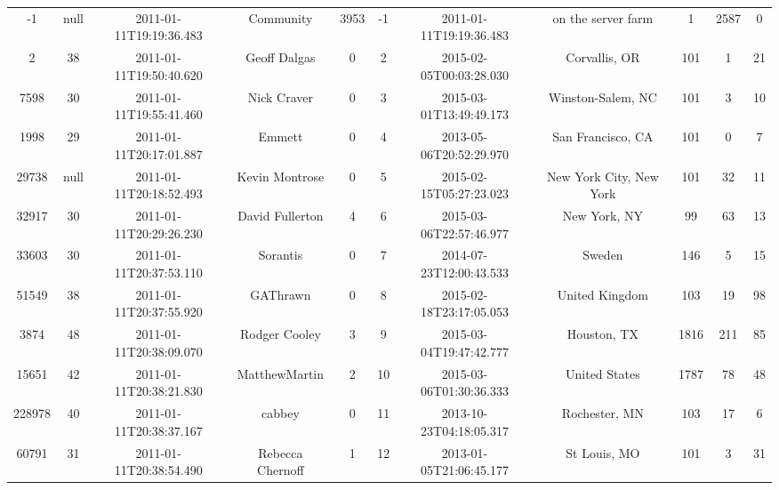 \documentclass[12pt,a4paper,twoside,openright,titlepage,final]{article}
\begin{document}
\begin{landscape}
\begin{center}
\begin{longtable}{@{\extracolsep{\fill}}*{11}{c}}
-1        & null & 2011-01-11T19:19:36.483 & Community             & 3953      & -1    & 2011-01-11T19:19:36.483 & on the server farm               & 1          & 2587    & 0     \\
			2         & 38   & 2011-01-11T19:50:40.620 & Geoff Dalgas          & 0         & 2     & 2015-02-05T00:03:28.030 & Corvallis, OR                    & 101        & 1       & 21    \\
			7598      & 30   & 2011-01-11T19:55:41.460 & Nick Craver           & 0         & 3     & 2015-03-01T13:49:49.173 & Winston-Salem, NC                & 101        & 3       & 10    \\
			1998      & 29   & 2011-01-11T20:17:01.887 & Emmett                & 0         & 4     & 2013-05-06T20:52:29.970 & San Francisco, CA                & 101        & 0       & 7     \\
			29738     & null & 2011-01-11T20:18:52.493 & Kevin Montrose        & 0         & 5     & 2015-02-15T05:27:23.023 & New York City, New York          & 101        & 32      & 11    \\
			32917     & 30   & 2011-01-11T20:29:26.230 & David Fullerton       & 4         & 6     & 2015-03-06T22:57:46.977 & New York, NY                     & 99         & 63      & 13    \\
			33603     & 30   & 2011-01-11T20:37:53.110 & Sorantis              & 0         & 7     & 2014-07-23T12:00:43.533 & Sweden                           & 146        & 5       & 15    \\
			51549     & 38   & 2011-01-11T20:37:55.920 & GAThrawn              & 0         & 8     & 2015-02-18T23:17:05.053 & United Kingdom                   & 103        & 19      & 98    \\
			3874      & 48   & 2011-01-11T20:38:09.070 & Rodger Cooley         & 3         & 9     & 2015-03-04T19:47:42.777 & Houston, TX                      & 1816       & 211     & 85    \\
			15651     & 42   & 2011-01-11T20:38:21.830 & MatthewMartin         & 2         & 10    & 2015-03-06T01:30:36.333 & United States                    & 1787       & 78      & 48    \\
			228978    & 40   & 2011-01-11T20:38:37.167 & cabbey                & 0         & 11    & 2013-10-23T04:18:05.317 & Rochester, MN                    & 103        & 17      & 6     \\
			60791     & 31   & 2011-01-11T20:38:54.490 & Rebecca Chernoff      & 1         & 12    & 2013-01-05T21:06:45.177 & St Louis, MO                     & 101        & 3       & 31    \\

\end{longtable}
\end{center}
\end{landscape}
\end{document}
